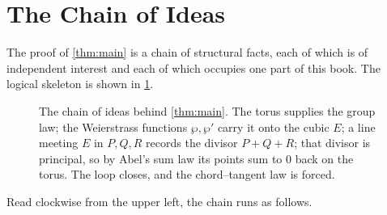 \section{The Chain of Ideas}
\label{sec:intro-chain}

The proof of \cref{thm:main} is a chain of structural facts, each of which is
of independent interest and each of which occupies one part of this book. The
logical skeleton is shown in \cref{fig:dependency}.

\begin{figure}[ht]
\centering
{}
\caption{The chain of ideas behind \cref{thm:main}. The torus supplies the
group law; the Weierstrass functions \(\wp,\wp'\) carry it onto the cubic
\(E\); a line meeting \(E\) in \(P,Q,R\) records the divisor \(P+Q+R\); that
divisor is principal, so by Abel's sum law its points sum to \(0\) back on the
torus. The loop closes, and the chord--tangent law is forced.}
\label{fig:dependency}
\end{figure}

Read clockwise from the upper left, the chain runs as follows.

